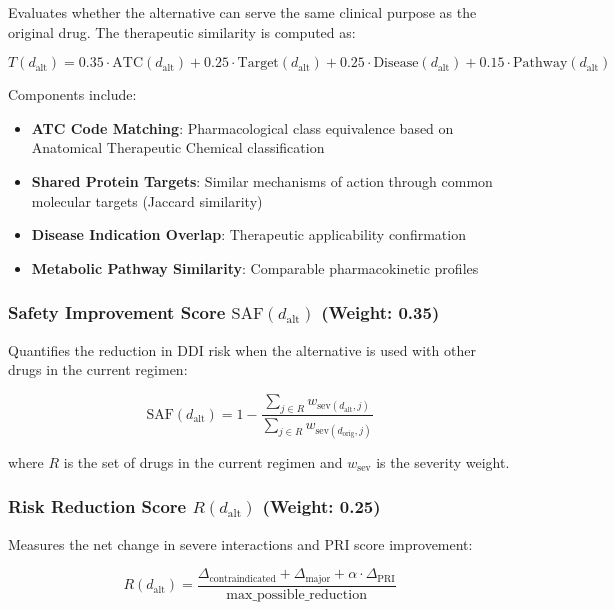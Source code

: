 \documentclass[11pt,a4paper]{article}
\begin{document}
Evaluates whether the alternative can serve the same clinical purpose as the original drug. The therapeutic similarity is computed as:

\begin{equation}
T(d_{\text{alt}}) = 0.35 \cdot \text{ATC}(d_{\text{alt}}) + 0.25 \cdot \text{Target}(d_{\text{alt}}) + 0.25 \cdot \text{Disease}(d_{\text{alt}}) + 0.15 \cdot \text{Pathway}(d_{\text{alt}})
\end{equation}

Components include:
\begin{itemize}
    \item \textbf{ATC Code Matching}: Pharmacological class equivalence based on Anatomical Therapeutic Chemical classification
    \item \textbf{Shared Protein Targets}: Similar mechanisms of action through common molecular targets (Jaccard similarity)
    \item \textbf{Disease Indication Overlap}: Therapeutic applicability confirmation
    \item \textbf{Metabolic Pathway Similarity}: Comparable pharmacokinetic profiles
\end{itemize}

\subsubsection{Safety Improvement Score $\text{SAF}(d_{\text{alt}})$ (Weight: 0.35)}

Quantifies the reduction in DDI risk when the alternative is used with other drugs in the current regimen:

\begin{equation}
\text{SAF}(d_{\text{alt}}) = 1 - \frac{\sum_{j \in R} w_{\text{sev}(d_{\text{alt}}, j)}}{\sum_{j \in R} w_{\text{sev}(d_{\text{orig}}, j)}}
\end{equation}

where $R$ is the set of drugs in the current regimen and $w_{\text{sev}}$ is the severity weight.

\subsubsection{Risk Reduction Score $R(d_{\text{alt}})$ (Weight: 0.25)}

Measures the net change in severe interactions and PRI score improvement:

\begin{equation}
R(d_{\text{alt}}) = \frac{\Delta_{\text{contraindicated}} + \Delta_{\text{major}} + \alpha \cdot \Delta_{\text{PRI}}}{\text{max\_possible\_reduction}}
\end{equation}
\end{document}
